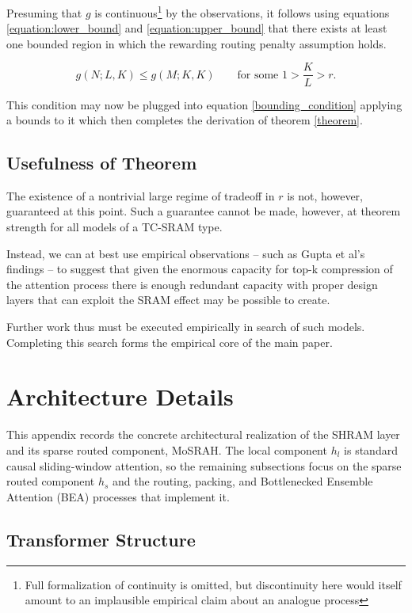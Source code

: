 \documentclass[11pt]{article}
\begin{document}
Presuming that $g$ is continuous\footnote{Full formalization of continuity is omitted, but discontinuity here would itself amount to an implausible empirical claim about an analogue process} by the observations, it follows using equations \ref{equation:lower_bound} and \ref{equation:upper_bound} that there exists at least one bounded region in which the rewarding routing penalty assumption holds.

\begin{equation}
g(N;L,K) \leq g(M;K,K)
\qquad\text{for some } 1 > \frac{K}{L} > r.
\end{equation}

This condition may now be plugged into equation \ref{bounding_condition} applying a bounds to it which then completes
the derivation of theorem \ref{theorem}.

\subsection{Usefulness of Theorem}

The existence of a nontrivial large regime of tradeoff in $r$ is not, however, guaranteed at this point. Such a guarantee cannot be made, however, at theorem strength for all models of a TC-SRAM type.

Instead, we can at best use empirical observations -- such as Gupta et al's findings -- to suggest that given the enormous capacity for top-k compression of the attention process there is enough redundant capacity with proper design layers that can exploit the SRAM effect may be possible to create.  \cite{gupta-etal-2021-memory}

Further work thus must be executed empirically in search of such models. Completing this search forms the empirical core of the main paper.

\section{Architecture Details}
\label{app:architecture}

This appendix records the concrete architectural realization of the SHRAM layer and its sparse routed component, MoSRAH. The local component $h_l$ is standard causal sliding-window attention, so the remaining subsections focus on the sparse routed component $h_s$ and the routing, packing, and Bottlenecked Ensemble Attention (BEA) processes that implement it.

\subsection{Transformer Structure}
\label{app:transformer_structure}
\end{document}
